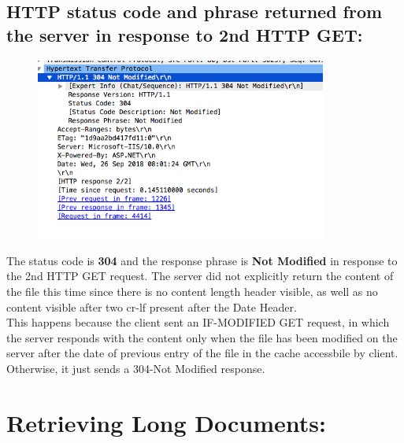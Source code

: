 \documentclass[]{report}
\begin{document}
\subsection{HTTP status code and phrase returned from the server in response to 2nd HTTP GET:}
\begin{figure}[H]
	\vspace{0pt}
	\includegraphics[height = 170pt, keepaspectratio]{Snapshots/q2/2_4.png}
\end{figure}
The status code is \textbf{304} and the response phrase is \textbf{Not Modified} in response to the 2nd HTTP GET request. The server did not explicitly return the content of the file this time since there is no content length header visible, as well as no content visible after two cr-lf present after the Date Header. \\
This happens because the client sent an IF-MODIFIED GET request, in which the server responds with the content only when the file has been modified on the server after the date of previous entry of the file in the cache accessbile by client. Otherwise, it just sends a 304-Not Modified response. 


\section{Retrieving Long Documents:}
\end{document}
